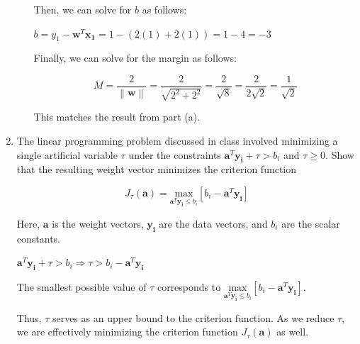 \documentclass[fleqn]{article}
\newcommand{\norm}[1]{\left \lVert #1 \right \rVert}
\begin{document}
\begin{enumerate}
\begin{enumerate}
		Then, we can solve for $b$ as follows:
	
		$b = y_1 - \mathbf{w}^T\mathbf{x_1} = 1 - (2(1) + 2(1)) = 1 - 4 = -3$
		
		Finally, we can solve for the margin as follows:
		
		\begin{equation*}
			M = \frac{2}{\norm{\mathbf{w}}} = \frac{2}{\sqrt{2^2 + 2^2}} = \frac{2}{\sqrt{8}} = \frac{2}{2\sqrt{2}} = \frac{1}{\sqrt{2}}
		\end{equation*}
		
		This matches the result from part (a).
		
	\end{enumerate}
	
	\item The linear programming problem discussed in class involved minimizing a single artificial variable $\tau$ under the constraints $\mathbf{a}^T\mathbf{y_i} + \tau > b_i$ and $\tau \geq 0$. Show that the resulting weight vector minimizes the criterion function
	
	\begin{equation*}
		J_{\tau}(\mathbf{a}) = \underset{\mathbf{a}^T\mathbf{y_i} \leq b_i}{\text{max}}[b_i - \mathbf{a}^T\mathbf{y_i}]
	\end{equation*}
	
	Here, $\mathbf{a}$ is the weight vectors, $\mathbf{y_i}$ are the data vectors, and $b_i$ are the scalar constants.
	
	$\mathbf{a}^T\mathbf{y_i} + \tau > b_i \Rightarrow \tau > b_i -  \mathbf{a}^T\mathbf{y_i}$
	
	The smallest possible value of $\tau$ corresponds to $\underset{\mathbf{a}^T\mathbf{y_i} \leq b_i}{\text{max}}[b_i - \mathbf{a}^T\mathbf{y_i}]$.
	
	Thus, $\tau$ serves as an upper bound to the criterion function. As we reduce $\tau$, we are effectively minimizing the criterion function $J_{\tau}(\mathbf{a})$ as well.
	
	
	
	\end{enumerate}
\end{document}
